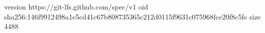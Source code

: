 version https://git-lfs.github.com/spec/v1
oid sha256:146f9912498a1e5cd41c67b808735365c212d0115f9631c075968fce20f8c5fe
size 4488
